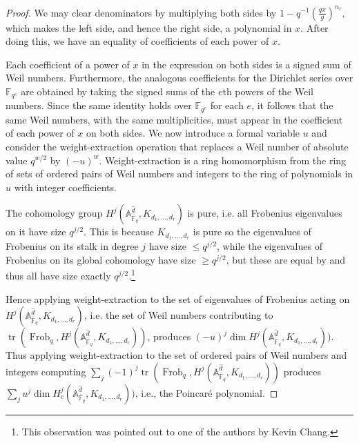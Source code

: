 \documentclass[11pt,letterpaper]{article}
\theoremstyle{definition}
\theoremstyle{remark}
\numberwithin{equation}{section}
\theoremstyle{dotless}
\newcommand{\Frob}{\operatorname{Frob}}
\newcommand{\tr}{\operatorname{tr}}
\begin{document}
\begin{proof}
We may clear denominators by multiplying both sides by  $1-q^{-1 } \left( \frac{qx}{g}\right)^{n_r} $, which makes the left side, and hence the right side, a polynomial in $x$. After doing this, we have an equality of coefficients of each power of $x$.

Each coefficient of a power of $x$ in the expression on both sides is a signed sum of Weil numbers. Furthermore, the analogous coefficients for the Dirichlet series over $\mathbb F_{q^e}$ are obtained by taking the signed sums of the $e$th powers of the Weil numbers. Since the same identity holds over $\mathbb F_{q^e}$ for each $e$, it follows that the same Weil numbers, with the same multiplicities, must appear in the coefficient of each power of $x$ on both sides. We now introduce a formal variable $u$ and consider the weight-extraction operation that replaces a Weil number of absolute value $q^{ w/2}$ by $(-u)^w$. Weight-extraction is a ring homomorphism from the ring of sets of ordered pairs of Weil numbers and integers to the ring of polynomials in $u$ with integer coefficients.

The cohomology group $H^j( \mathbb A^{\hat{d} }_{\overline{\mathbb F}_q}, K_{d_1,\dots, d_r})$ is pure, i.e. all Frobenius eigenvalues on it have size $q^{j/2}$. This is because $K_{d_1,\dots, d_r}$ is pure so the eigenvalues of Frobenius on its stalk in degree $j$ have size $\leq q^{j/2}$, while the eigenvalues of Frobenius on its global cohomology have size $\geq q^{j/2}$, but these are equal by \cite[Lemma 2.16]{s-amds} and thus all have size exactly $q^{j/2}$.\footnote{This observation was pointed out to one of the authors by Kevin Chang.}

Hence applying weight-extraction to the set of eigenvalues of Frobenius acting on $H^j( \mathbb A^{\hat{d} }_{\overline{\mathbb F}_q}, K_{d_1,\dots, d_r})$, i.e. the set of Weil numbers contributing to $\tr( \Frob_q , H^j( \mathbb A^{\hat{d} }_{\overline{\mathbb F}_q}, K_{d_1,\dots, d_r}))$, produces $(-u)^j \dim H^j( \mathbb A^{\hat{d} }_{\overline{\mathbb F}_q}, K_{d_1,\dots, d_r}))$. Thus applying weight-extraction to the set of ordered pairs of Weil numbers and integers computing $\sum_j (-1)^j \tr( \Frob_q , H^j( \mathbb A^{\hat{d} }_{\overline{\mathbb F}_q}, K_{d_1,\dots, d_r})) $ produces $\sum_j u^j \dim H^j_c( \mathbb A^{\hat{d} }_{\overline{\mathbb F}_q}, K_{d_1,\dots, d_r}))$, i.e., the Poincar\'e polynomial.


\end{proof}
\end{document}
